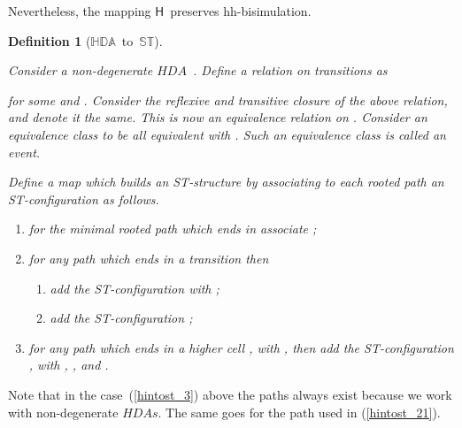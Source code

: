 \documentclass[submission,copyright,creativecommons]{eptcs}
\newtheorem{lemma}[theorem]{Lemma}
\newtheorem{definition}[theorem]{Definition}
\newenvironment{proof}[1][\!\!\,]{\vspace{1ex}\noindent\textbf{Proof #1: }}{\hfill\vspace{2ex}}
\newcommand{\refeq}[1]{(\ref{#1})}
\newcommand{\cp}[1]{}
\newcounter{case}
\newcommand\HDA{\ensuremath{\mathit{HDA}}}
\newcommand\HDAs{\ensuremath{\mathit{HDAs}}}
\newcommand\allST{\ensuremath{\mathbb{ST}}}
\newcommand\allHDA{\ensuremath{\mathbb{HDA}}}
\newcommand\stintoh{\ensuremath{\mathsf{H}}}
\begin{document}
Nevertheless, the mapping \stintoh\ preserves hh-bisimulation.



\begin{definition}[\allHDA\ to\ \allST]\label{def_hdaTOst}\ 

Consider a non-degenerate \HDA\ .
Define a relation  on transitions as 

for some  and .
Consider the reflexive and transitive closure of the above relation, and denote it the same. This is now an equivalence relation on . Consider an equivalence class  to be all  equivalent with .
Such an equivalence class is called \emph{an event}.

Define a map  which builds an ST-structure  by associating to each rooted path  an ST-configuration as follows.
\begin{enumerate}
\item\label{hintost_1} for the minimal rooted path which ends in  associate ;

\item\label{hintost_2} for any path  which ends in a transition  then 
\begin{enumerate}
\item\label{hintost_21} add the ST-configuration  with ;

\item\label{hintost_22} add the ST-configuration ;
\end{enumerate}

\item\label{hintost_3} for any path  which ends in a higher cell , with , then add the ST-configuration , with , , and .
\end{enumerate}
\end{definition}

Note that in the case~\refeq{hintost_3} above the paths  always exist because we work with non-degenerate \HDAs. The same goes for the path  used in \refeq{hintost_21}.

\cp{
The definition above is based on the following lemma.

\begin{lemma}
Two homotopic paths  are translated in the same ST-configuration:

\centerline{.}
\end{lemma}

\begin{proof}

\end{proof}
}
\end{document}
